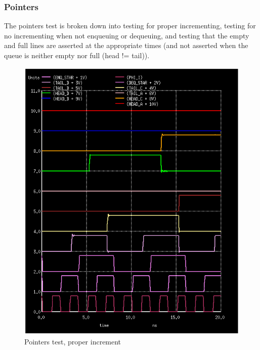 \documentclass[12pt]{report}
\begin{document}
\subsubsection*{Pointers}
The pointers test is broken down into testing for proper incrementing, testing for no incrementing when not enqueuing or dequeuing, and testing that the empty and full lines are asserted at the appropriate times (and not asserted when the queue is neither empty nor full (head != tail)).
\begin{figure}[H]
  \centering
    \includegraphics[width=1.0\textwidth]{pointers_test.PNG}
  \caption{Pointers test, proper increment}
  \label{fig:pointers_test}
\end{figure}
\end{document}
